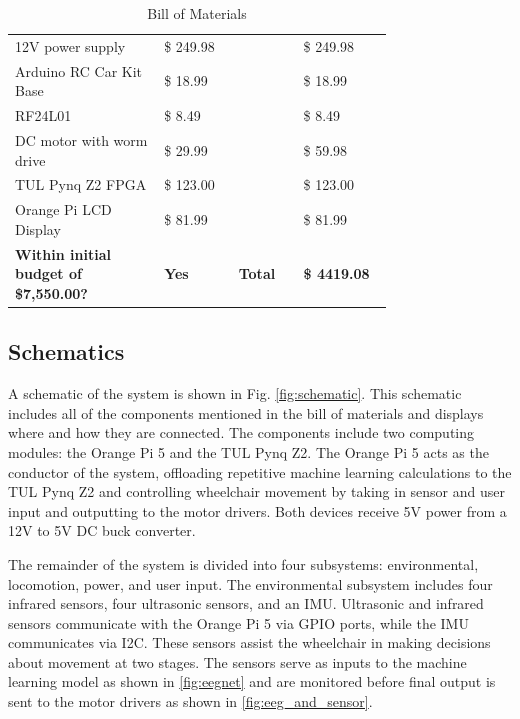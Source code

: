 \documentclass[conference]{IEEEtran}
\begin{document}
\begin{table}[htbp]
\begin{tabular}{|>{\raggedright\arraybackslash}p{0.30\linewidth}|>{\raggedright\arraybackslash}p{0.15\linewidth}|>{\raggedright\arraybackslash}p{0.12\linewidth}|>{\raggedright\arraybackslash}p{0.18\linewidth}|}
             \rowcolor{black!10}
             12V power supply & \$ 249.98 & 1 & \$ 249.98 \\

            \rowcolor{black!5}
             Arduino RC Car Kit Base & \$ 18.99 & 1 & \$ 18.99 \\

             \rowcolor{black!10}
              RF24L01 & \$ 8.49 & 1 & \$ 8.49 \\

              \rowcolor{black!5}
              DC motor with worm drive & \$ 29.99 & 2 & \$ 59.98 \\

              \rowcolor{black!10}
              TUL Pynq Z2 FPGA & \$ 123.00 & 1 & \$ 123.00 \\

            \rowcolor{black!5}
              Orange Pi LCD Display & \$ 81.99 & 1 & \$ 81.99 \\

     
            \hline
            \rowcolor{black!20} 
            {\textbf{Within initial budget of \$7,550.00? }} 
            & \textbf{Yes} 
            & \textbf{Total} 
            & \textbf{\$ 4419.08} 
            \\
            \hline
        \end{tabular}

        \caption{Bill of Materials}
        \label{tab:final_design_bom}
    \end{table}    
    
    \subsection{Schematics}
    A schematic of the system is shown in Fig. \ref{fig:schematic}. This schematic includes all of the components mentioned in the bill of materials and displays where and how they are connected. The components include two computing modules: the Orange Pi 5 and the TUL Pynq Z2. The Orange Pi 5 acts as the conductor of the system, offloading repetitive machine learning calculations to the TUL Pynq Z2 and controlling wheelchair movement by taking in sensor and user input and outputting to the motor drivers. Both devices receive 5V power from a 12V to 5V DC buck converter.

    The remainder of the system is divided into four subsystems: environmental, locomotion, power, and user input. The environmental subsystem includes four infrared sensors, four ultrasonic sensors, and an IMU. Ultrasonic and infrared sensors communicate with the Orange Pi 5 via GPIO ports, while the IMU communicates via I2C. These sensors assist the wheelchair in making decisions about movement at two stages. The sensors serve as inputs to the machine learning model as shown in \ref{fig:eegnet} and are monitored before final output is sent to the motor drivers as shown in \ref{fig:eeg_and_sensor}. 
\end{document}
